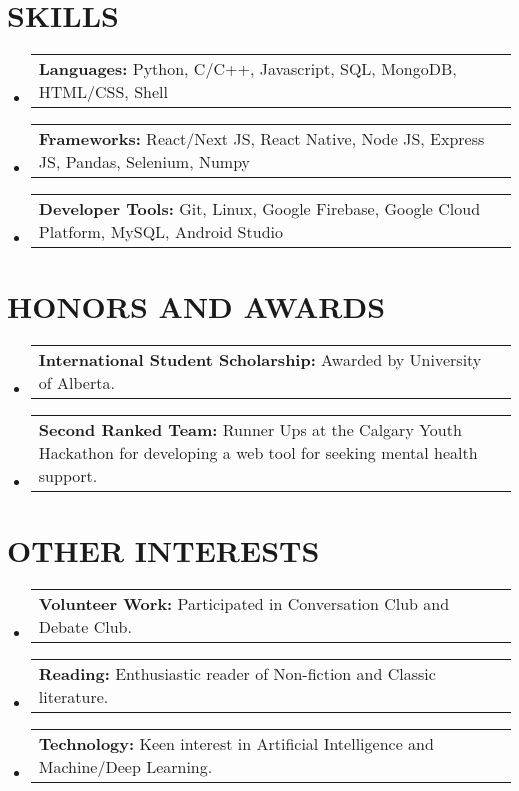 \documentclass[letterpaper,11pt]{article}
\makeatletter
\newcommand{\resumeProjectHeading}[2]{
    \item
    \begin{tabular*}{\textwidth}{l@{\extracolsep{\fill}}r}
      \small#1 & #2 \\
    \end{tabular*}\vspace{-6pt}
}
\newcommand{\resumeSubHeadingListStart}{\begin{itemize}[leftmargin=0in, label={}]}
\newcommand{\resumeSubHeadingListEnd}{\end{itemize}}
\makeatother
\begin{document}
\section{ SKILLS}
    \resumeSubHeadingListStart
      \resumeProjectHeading
          {\textbf{Languages:} Python, C/C\small{++}, Javascript, SQL, MongoDB, HTML/CSS, Shell}{}
      \resumeProjectHeading
          {\textbf{Frameworks:} React/Next JS, React Native, Node JS, Express JS, Pandas, Selenium, Numpy}{}
      \resumeProjectHeading
          {\textbf{Developer Tools:} Git, Linux, Google Firebase, Google Cloud Platform,  MySQL, Android Studio}{}
    \resumeSubHeadingListEnd

%
\section{ HONORS AND AWARDS}
    \resumeSubHeadingListStart
      \resumeProjectHeading
          {\textbf{International Student Scholarship:} Awarded by University of Alberta.}{}
      \resumeProjectHeading
          {\textbf{Second Ranked Team:} Runner Ups at the Calgary Youth Hackathon for developing a web tool for seeking mental health support.}{}
    \resumeSubHeadingListEnd

%
\section{OTHER INTERESTS}
    \resumeSubHeadingListStart
      \resumeProjectHeading
          {\textbf{Volunteer Work:} Participated in Conversation Club and Debate Club.}{}
      \resumeProjectHeading
          {\textbf{Reading:} Enthusiastic reader of Non-fiction and Classic literature.}{}
      \resumeProjectHeading
          {\textbf{Technology:} Keen interest in Artificial Intelligence and Machine/Deep Learning.}{}
    \resumeSubHeadingListEnd

\end{document}
